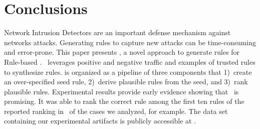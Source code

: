 \documentclass[conference]{IEEEtran}
\begin{document}
\section{Conclusions}

Network Intrusion Detectors are an important defense mechanism against
networks attacks. Generating rules to capture new attacks can be
time-consuming and error-prone. This paper presents \tname{}, a novel
approach to generate rules for Rule-based \nids. \tname\ leverages
positive and negative traffic and examples of trusted rules to
synthesize rules. \tname{} is organized as a pipeline of three
components that 1)~create an over-specified seed rule, 2)~derive
plausible rules from the seed, and 3)~rank plausible
rules. Experimental results provide early evidence showing that
\tname\ is promising. It was able to rank the correct rule among the
first ten rules of the reported ranking in \percTopTenRanking\ of
the cases we analyzed, for example. The data set containing our
experimental artifacts is publicly accessible at \ourdataset.



\balance
%


\end{document}
